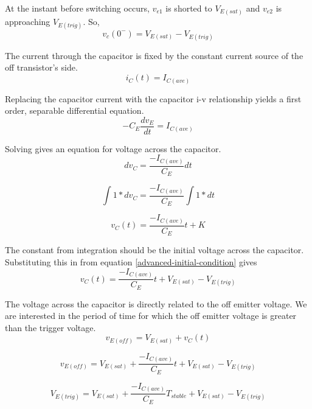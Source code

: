 \documentclass[titlepage, letterpaper, 10.5pt]{article}
\begin{document}
At the instant before switching occurs, $v_{e1}$ is shorted to $V_{E(sat)}$ and
$v_{e2}$ is approaching $V_{E(trig)}$. So,
\begin{equation}
v_{c}(0^{-})=V_{E(sat)}-V_{E(trig)}
\label{advanced-initial-condition}
\end{equation}

The current through the capacitor is fixed by the constant current source
of the off transistor's side.
\begin{equation*}
i_{C}(t)=I_{C(ave)}
\end{equation*}

Replacing the capacitor current with the capacitor i-v relationship yields
a first order, separable differential equation.
\begin{equation*}
-C_{E}\frac{dv_{E}}{dt}=I_{C(ave)}
\end{equation*}

Solving gives an equation for voltage across the capacitor.
\begin{equation*}
dv_{C}=\frac{-I_{C(ave)}}{C_{E}}dt
\end{equation*}

\begin{equation*}
\int 1*dv_{C}=\frac{-I_{C(ave)}}{C_{E}}\int 1*dt
\end{equation*}

\begin{equation*}
v_{C}(t)=\frac{-I_{C(ave)}}{C_{E}}t+K
\end{equation*}

The constant from integration should be the initial voltage across the capacitor.
Substituting this in from equation \ref{advanced-initial-condition} gives
\begin{equation}
v_{C}(t)=\frac{-I_{C(ave)}}{C_{E}}t+V_{E(sat)}-V_{E(trig)}
\end{equation}

The voltage across the capacitor is directly related to the off emitter voltage.
We are interested in the period of time for which the off emitter voltage is greater
than the trigger voltage.
\begin{equation*}
v_{E(off)}=V_{E(sat)}+v_{C}(t)
\end{equation*}

\begin{equation*}
v_{E(off)}=V_{E(sat)}+\frac{-I_{C(ave)}}{C_{E}}t+V_{E(sat)}-V_{E(trig)}
\end{equation*}

\begin{equation*}
V_{E(trig)}=V_{E(sat)}+\frac{-I_{C(ave)}}{C_{E}}T_{stable}+V_{E(sat)}-V_{E(trig)}
\end{equation*}
\end{document}

